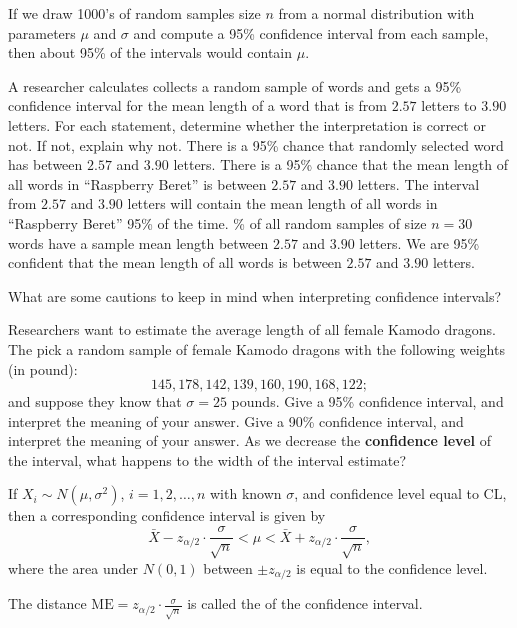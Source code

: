 If we draw 1000's of random samples size $n$ from a normal distribution with parameters $\mu$ and $\sigma$ and compute a 95\% confidence interval from each sample, then about 95\% of the intervals would contain $\mu$.
\ebox

\clearpage
{}

\bb[resume]
\ii A researcher calculates collects a random sample of words and gets a 95\% confidence interval for the mean length of a word that is from $2.57$ letters to $3.90$ letters. For each statement, determine whether the interpretation is correct or not. If not, explain why not.
\bb
\ii There is a 95\% chance that randomly selected word has between $2.57$ and $3.90$ letters. \vfill
\ii There is a 95\% chance that the mean length of all words in ``Raspberry Beret''  is between $2.57$ and $3.90$ letters. \vfill
\ii The interval from $2.57$ and $3.90$ letters will contain the mean length of all words in ``Raspberry Beret''  95\% of the time. \vfill
{}\% of all random samples of size $n=30$ words have a sample mean length between $2.57$ and $3.90$ letters. \vfill
\ii We are 95\% confident that the mean length of all words is between $2.57$ and $3.90$ letters. \vfill
\ee

\ii What are some cautions to keep in mind when interpreting confidence intervals? \vfill

\clearpage


\ii Researchers want to estimate the average length of all female Kamodo dragons. The pick a random sample of female Kamodo dragons with the following weights (in pound):
\[ 145, 178, 142, 139, 160, 190, 168, 122; \]
and suppose they know that $\sigma = 25$ pounds.
\bb
\ii Give a 95\% confidence interval, and interpret the meaning of your answer. \vfill
\ii Give a 90\% confidence interval, and interpret the meaning of your answer. \vfill
\ii As we decrease the \textbf{confidence level} of the interval, what happens to the width of the interval estimate? \vfill
\ee
\ee

\bbox
If $X_i \sim N(\mu, \sigma^2)$, $i=1,2,\ldots , n$ with known $\sigma$, and confidence level equal to CL, then a corresponding
confidence interval is given by
\[  \bar{X} - z_{\alpha/2} \cdot \frac{\sigma}{\sqrt{n}} < \mu < \bar{X} + z_{\alpha/2} \cdot \frac{\sigma}{\sqrt{n}}, \]
where the area under $N(0,1)$ between $\pm z_{\alpha/2}$ is equal to the confidence level.

The distance $\mbox{ME} = z_{\alpha/2} \cdot \frac{\sigma}{\sqrt{n}}$ is called the  of the
confidence interval.
\ebox


